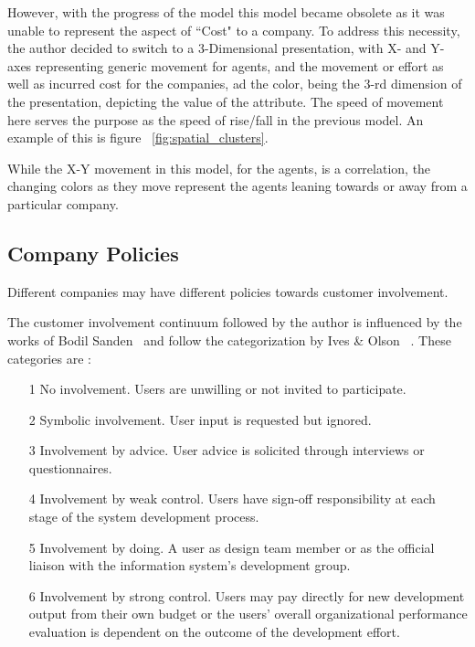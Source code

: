 However, with the progress of the model this model became obsolete as it was unable to represent the aspect of ``Cost" to a company. 
To address this necessity, the author decided to switch to a 3-Dimensional presentation, with X- and Y- axes representing generic movement for agents, and the movement or effort as well as incurred cost for the companies, ad the color, being the 3-rd dimension of the presentation, depicting the value of the attribute. The speed of movement here serves the purpose as the speed of rise/fall in the previous model. An example of this is figure ~\ref{fig:spatial_clusters}.

While the X-Y movement in this model, for the agents, is a correlation, the changing colors as they move represent the agents leaning towards or away from a particular company.

\subsection{Company Policies}

Different companies may have different policies towards customer involvement. 

The customer involvement continuum followed by the author is influenced by the works of Bodil Sanden~\cite{bodil} and follow the categorization by Ives \& Olson ~\cite{1984}.
These categories are :

\begin{enumerate}

\item[1] No involvement. Users are unwilling or not invited to participate.
\item[2] Symbolic involvement. User input is requested but ignored. 
\item[3] Involvement by advice. User advice is solicited through interviews
or questionnaires.
\item[4]  Involvement by weak control. Users have sign-off responsibility at
each stage of the system development process. 
\item[5] Involvement by doing. A user as design team member or as the
official liaison with the information system’s development group. 
\item[6] Involvement by strong control. Users may pay directly for new
development output from their own budget or the users’ overall
organizational performance evaluation is dependent on the
outcome of the development effort. 
\end{enumerate}

